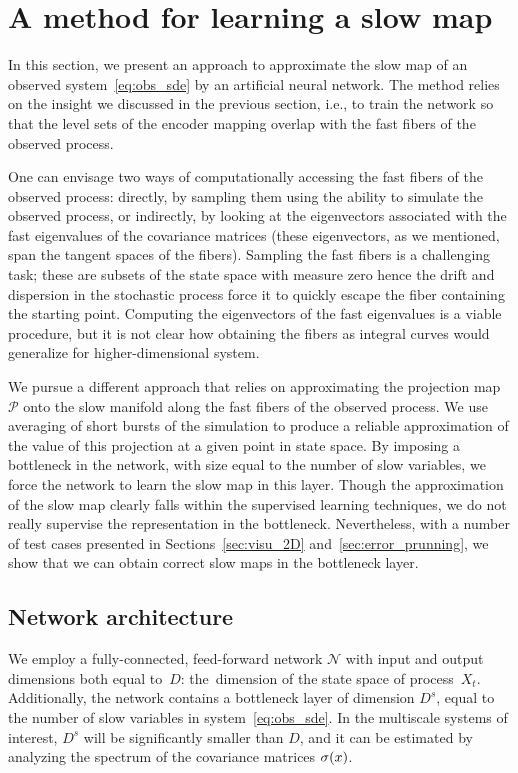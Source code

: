\documentclass{article}
\newcommand{\net}{\mathcal{N}} %
\newcommand{\proj}{\mathcal{P}} %
\begin{document}
\section{A method for learning a slow map}\label{sec:method}
In this section, we present an approach to approximate the slow map of an observed system~\eqref{eq:obs_sde} by an artificial neural network. The method relies on the insight we discussed in the previous section, i.e., to train the network so that the level sets of the encoder mapping overlap with the fast fibers of the observed process.

One can envisage two ways of computationally accessing the fast fibers of the observed process: directly, by sampling them using the ability to simulate the observed process, or indirectly, by looking at the eigenvectors associated with the fast eigenvalues of the covariance matrices (these eigenvectors, as we mentioned, span the tangent spaces of the fibers). Sampling the fast fibers is a challenging task; these are subsets of the state space with measure zero hence the drift and dispersion in the stochastic process force it to quickly escape the fiber containing the starting point. Computing the eigenvectors of the fast eigenvalues is a viable procedure, but it is not clear how obtaining the fibers as integral curves would generalize for higher-dimensional system.

We pursue a different approach that relies on approximating the projection map $\proj$ onto the slow manifold along the fast fibers of the observed process. We use averaging of short bursts of the simulation to produce a reliable approximation of the value of this projection at a given point in state space. By imposing a bottleneck in the network, with size equal to the number of slow variables, we force the network to learn the slow map in this layer. Though the approximation of the slow map clearly falls within the supervised learning techniques, we do not really supervise the representation in the bottleneck. Nevertheless, with a number of test cases presented in Sections~\ref{sec:visu_2D} and~\ref{sec:error_prunning}, we show that we can obtain correct slow maps in the bottleneck layer.

\subsection{Network architecture}\label{sec:architecture}
We employ a fully-connected, feed-forward network $\net$ with input and output dimensions both equal to~$D$: the~dimension of the state space of process~$X_t$. Additionally, the network contains a bottleneck layer of dimension $D^s$, equal to the number of slow variables in system~\eqref{eq:obs_sde}. In the multiscale systems of interest, $D^s$ will be significantly smaller than $D$, and it can be estimated by analyzing the spectrum of the covariance matrices $\sigma(x)$.
\end{document}
